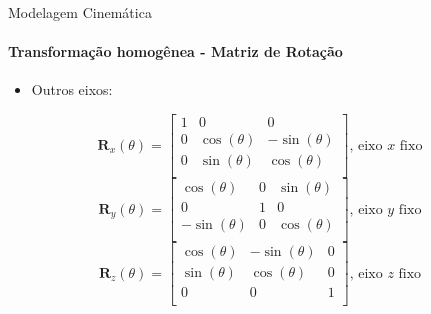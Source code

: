 \documentclass[aspectratio=169]{beamer}
\begin{document}
\begin{frame}{Modelagem Cinemática}
    \framesubtitle{Transformação homogênea - Matriz de Rotação}
    \begin{itemize}
        \item Outros eixos:
    \end{itemize}
    \begin{block}{}
        \begin{equation*}
            \mathbf{R}_x(\theta) =
            \begin{bmatrix}
                1 & 0            & 0             \\
                0 & \cos(\theta) & -\sin(\theta) \\
                0 & \sin(\theta) & \cos(\theta)  \\
            \end{bmatrix} \text{, eixo $x$ fixo}
        \end{equation*}
        \begin{equation*}
            \mathbf{R}_y(\theta) =
            \begin{bmatrix}
                \cos(\theta)  & 0 & \sin(\theta) \\
                0             & 1 & 0            \\
                -\sin(\theta) & 0 & \cos(\theta) \\
            \end{bmatrix} \text{, eixo $y$ fixo}
        \end{equation*}
        \begin{equation*}
            \mathbf{R}_z(\theta) =
            \begin{bmatrix}
                \cos(\theta) & -\sin(\theta) & 0 \\
                \sin(\theta) & \cos(\theta) & 0 \\
                0            & 0            & 1 \\
            \end{bmatrix} \text{, eixo $z$ fixo}
        \end{equation*}
    \end{block}
\end{frame}
\end{document}
